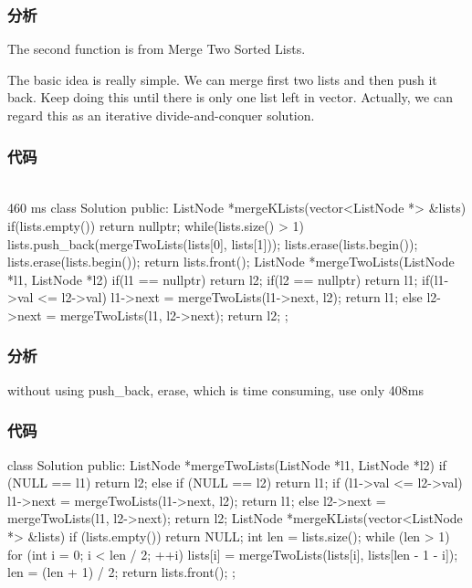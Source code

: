 \subsubsection{分析}
The second function is from Merge Two Sorted Lists.

The basic idea is really simple. We can merge first two lists and then push it back. Keep doing this until there is only one list left in vector. Actually, we can regard this as an iterative divide-and-conquer solution.

\subsubsection{代码}
\begin{Code}
\\ 460 ms
class Solution {
public:
    ListNode *mergeKLists(vector<ListNode *> &lists) {
        if(lists.empty()) {
            return nullptr;
        }
        while(lists.size() > 1) {
            lists.push_back(mergeTwoLists(lists[0], lists[1]));
            lists.erase(lists.begin());
            lists.erase(lists.begin());
        }
        return lists.front();
    }
    ListNode *mergeTwoLists(ListNode *l1, ListNode *l2) {
        if(l1 == nullptr) {
            return l2;
        }
        if(l2 == nullptr) {
            return l1;
        }
        if(l1->val <= l2->val) {
            l1->next = mergeTwoLists(l1->next, l2);
            return l1;
        } else {
            l2->next = mergeTwoLists(l1, l2->next);
            return l2;
        }
    }
};
\end{Code}

\subsubsection{分析}
without using push_back, erase, which is time consuming, use only 408ms

\subsubsection{代码}
\begin{Code}
class Solution {
public:
    ListNode *mergeTwoLists(ListNode *l1, ListNode *l2) {
        if (NULL == l1) return l2;
        else if (NULL == l2) return l1;
        if (l1->val <= l2->val) {
            l1->next = mergeTwoLists(l1->next, l2);
            return l1;
        } else {
            l2->next = mergeTwoLists(l1, l2->next);
            return l2;
        }
    }
    ListNode *mergeKLists(vector<ListNode *> &lists) {
        if (lists.empty()) return NULL;
        int len = lists.size();
        while (len > 1) {
            for (int i = 0; i < len / 2; ++i) {
                lists[i] = mergeTwoLists(lists[i], lists[len - 1 - i]);
            }
            len = (len + 1) / 2;
        }
        return lists.front();
    }
};
\end{Code}

